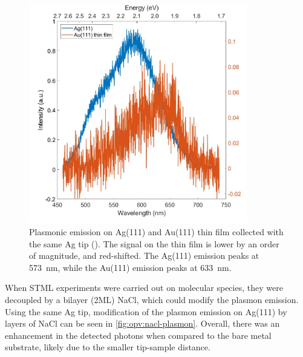 
\begin{figure} [h]
    \centering
    \includegraphics[width=0.85\textwidth]{pictures/Ag_Au_plasmon_3V_200pA_10s.jpg}
    \caption{Plasmonic emission on Ag(111) and Au(111) thin film collected with the same Ag tip (). The signal on the thin film is lower by an order of magnitude, and red-shifted. The Ag(111) emission peaks at \SI{573}{nm}, while the Au(111) emission peaks at \SI{633}{nm}.}
    \label{fig:opv:metal-plasmon}
\end{figure}



When \ac{STML} experiments were carried out on molecular species, they were decoupled by a bilayer (2\ac{ML}) NaCl, which could modify the plasmon emission. Using the same Ag tip, modification of the plasmon emission on Ag(111) by layers of NaCl can be seen in \autoref{fig:opv:nacl-plasmon}. Overall, there was an enhancement in the detected photons when compared to the bare metal substrate, likely due to the smaller tip-sample distance.



